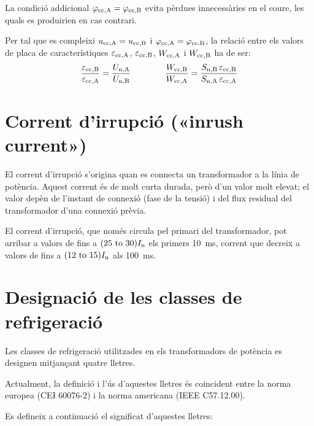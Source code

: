 La condició addicional $\varphi_\mathrm{cc,A} =\varphi_\mathrm{cc,B}$ evita pèrdues innecessàries en el coure, les quals es produirien en cas contrari.

Per tal que es compleixi $u_\mathrm{cc,A} = u_\mathrm{cc,B} $ i $\varphi_\mathrm{cc,A} =\varphi_\mathrm{cc,B}$, la relació entre els valors de placa de característiques $\varepsilon_\mathrm{cc,A}$, $\varepsilon_\mathrm{cc,B}$, $W_\mathrm{cc,A}$ i $W_\mathrm{cc,B}$ ha de ser:
\begin{equation}
    \frac{\varepsilon_\mathrm{cc,B}}{\varepsilon_\mathrm{cc,A}} = \frac{U_\mathrm{n,A}}{U_\mathrm{n,B}} \qquad\qquad
    \frac{W_\mathrm{cc,B}}{W_\mathrm{cc,A}} = \frac{S_\mathrm{n,B} \,\varepsilon_\mathrm{cc,B}}{S_\mathrm{n,A}\, \varepsilon_\mathrm{cc,A}}
\end{equation}

\section{Corrent d'irrupció («inrush current»)}

El corrent d'irrupció s'origina quan es  connecta un transformador a la línia de potència. Aquest corrent és de molt curta durada, però d'un valor molt elevat; el valor depèn de l'instant de connexió (fase de la tensió) i del flux residual del transformador d'una connexió prèvia.

El corrent d'irrupció, que només circula pel primari del transformador, pot arribar a valors de fins a $(\numrange{25}{30}) I\ped{n}$ els primers \SI{10}{ms}, corrent que decreix a valors de fins  a $(\numrange{12}{15}) I\ped{n}$ als \SI{100}{ms}.

\section{Designació de les classes de refrigeració}\label{sec:trafos-pot-refrig}
 

Les classes de refrigeració utilitzades en els transformadors de
potència es designen mitjançant quatre lletres.

Actualment, la definició i l'ús d'aquestes lletres és coincident
entre la norma europea (CEI 60076-2) i la norma americana
(IEEE C57.12.00).

Es defineix a continuació el significat d'aquestes lletres:

